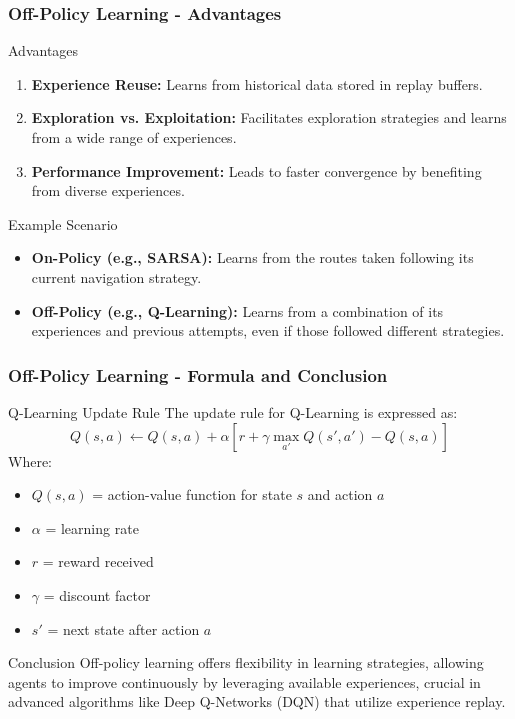 \documentclass[aspectratio=169]{beamer}
\begin{document}
\begin{frame}[fragile]
    \frametitle{Off-Policy Learning - Advantages}
    \begin{block}{Advantages}
        \begin{enumerate}
            \item \textbf{Experience Reuse:} Learns from historical data stored in replay buffers.
            \item \textbf{Exploration vs. Exploitation:} Facilitates exploration strategies and learns from a wide range of experiences.
            \item \textbf{Performance Improvement:} Leads to faster convergence by benefiting from diverse experiences. 
        \end{enumerate}
    \end{block}
    
    \begin{block}{Example Scenario}
        \begin{itemize}
            \item \textbf{On-Policy (e.g., SARSA):} Learns from the routes taken following its current navigation strategy.
            \item \textbf{Off-Policy (e.g., Q-Learning):} Learns from a combination of its experiences and previous attempts, even if those followed different strategies.
        \end{itemize}
    \end{block}
\end{frame}

\begin{frame}[fragile]
    \frametitle{Off-Policy Learning - Formula and Conclusion}
    \begin{block}{Q-Learning Update Rule}
        The update rule for Q-Learning is expressed as:
        \begin{equation}
            Q(s, a) \leftarrow Q(s, a) + \alpha [r + \gamma \max_{a'} Q(s', a') - Q(s, a)]
        \end{equation}
        Where:
        \begin{itemize}
            \item \( Q(s, a) \) = action-value function for state \( s \) and action \( a \)
            \item \( \alpha \) = learning rate
            \item \( r \) = reward received
            \item \( \gamma \) = discount factor
            \item \( s' \) = next state after action \( a \)
        \end{itemize}
    \end{block}

    \begin{block}{Conclusion}
        Off-policy learning offers flexibility in learning strategies, allowing agents to improve continuously by leveraging available experiences, crucial in advanced algorithms like Deep Q-Networks (DQN) that utilize experience replay.
    \end{block}
\end{frame}
\end{document}

